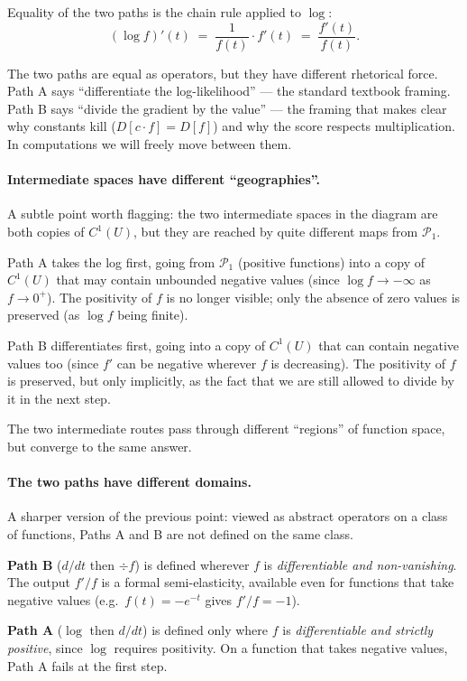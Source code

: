 \documentclass[a4paper,oneside,12pt]{extarticle}
\theoremstyle{plain}
\theoremstyle{definition}
\theoremstyle{remark}
\begin{document}
Equality of the two paths is the chain rule applied to $\log$:
\[
  (\log f)'(t) \;=\; \frac{1}{f(t)}\cdot f'(t) \;=\; \frac{f'(t)}{f(t)}.
\]

The two paths are equal as operators, but they have different
rhetorical force.  Path A says ``differentiate the log-likelihood''
--- the standard textbook framing.  Path B says ``divide the gradient
by the value'' --- the framing that makes clear why constants kill
($D[c\cdot f] = D[f]$) and why the score respects multiplication.
In computations we will freely move between them.

\paragraph{Intermediate spaces have different ``geographies''.}
A subtle point worth flagging: the two intermediate spaces in the
diagram are both copies of $C^1(U)$, but they are reached by quite
different maps from $\mathcal{P}_1$.

Path A takes the log first, going from $\mathcal{P}_1$ (positive
functions) into a copy of $C^1(U)$ that may contain unbounded
negative values (since $\log f \to -\infty$ as $f \to 0^+$).  The
positivity of $f$ is no longer visible; only the absence of zero
values is preserved (as $\log f$ being finite).

Path B differentiates first, going into a copy of $C^1(U)$ that can
contain negative values too (since $f'$ can be negative wherever $f$
is decreasing).  The positivity of $f$ is preserved, but only
implicitly, as the fact that we are still allowed to divide by it
in the next step.

The two intermediate routes pass through different ``regions'' of
function space, but converge to the same answer.

\paragraph{The two paths have different domains.}
A sharper version of the previous point: viewed as abstract operators
on a class of functions, Paths A and B are not defined on the same
class.

\textbf{Path B} ($d/dt$ then $\div f$) is defined wherever $f$ is
\emph{differentiable and non-vanishing}.  The output $f'/f$ is a
formal semi-elasticity, available even for functions that take
negative values (e.g.\ $f(t) = -e^{-t}$ gives $f'/f = -1$).

\textbf{Path A} ($\log$ then $d/dt$) is defined only where $f$ is
\emph{differentiable and strictly positive}, since $\log$ requires
positivity.  On a function that takes negative values, Path A fails
at the first step.
\end{document}
